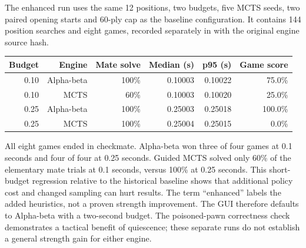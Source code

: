 The enhanced run uses the same 12 positions, two budgets, five MCTS seeds,
two paired opening starts and 60-ply cap as the baseline configuration. It
contains 144 position searches and eight games, recorded separately in
 with the original engine source hash.
\begin{center}
\begin{tabular}{rrrrrr}\toprule
Budget & Engine & Mate solve & Median (s) & p95 (s) & Game score\\\midrule
0.10 & Alpha-beta & 100\% & 0.10003 & 0.10022 & 75.0\% \\
0.10 & MCTS & 60\% & 0.10003 & 0.10020 & 25.0\% \\
0.25 & Alpha-beta & 100\% & 0.25003 & 0.25018 & 100.0\% \\
0.25 & MCTS & 100\% & 0.25004 & 0.25015 & 0.0\% \\
\bottomrule\end{tabular}
\end{center}
All eight games ended in checkmate. Alpha-beta won three of four games at
0.1 seconds and four of four at 0.25 seconds. Guided MCTS solved only 60\%
of the elementary mate trials at 0.1 seconds, versus 100\% at 0.25 seconds.
This short-budget regression relative to the historical baseline shows that
additional policy cost and changed sampling can hurt results. The term
``enhanced'' labels the added heuristics, not a proven strength improvement.
The GUI therefore defaults to Alpha-beta with a two-second budget. The
poisoned-pawn correctness check demonstrates a tactical benefit of quiescence;
these separate runs do not establish a general strength gain for either engine.
